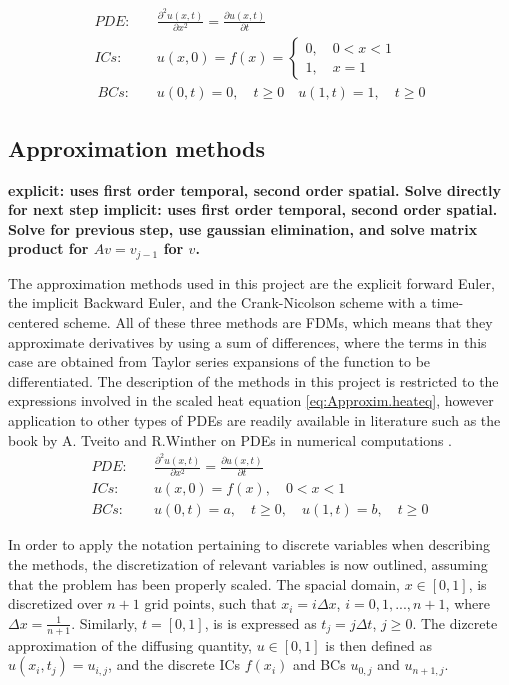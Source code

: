 \documentclass[%
oneside,                 %
final,                   %
10pt]{article}
\begin{document}
\begin{align}
PDE:&\quad \frac{\partial^2 u(x,t)}{\partial x^2}=\frac{\partial u(x,t)}{\partial t} \label{eq:scaled.rod}\\
ICs:&\quad u(x,0)=f(x)=  \begin{cases}
  0, \quad 0 < x < 1\\
 1, \quad x=1
  \end{cases} \label{eq:scaled.rodIC}\\\
BCs:& \quad u(0,t)=0, \quad t \geq 0 \quad u(1,t)=1, \quad t \geq 0 \label{eq:scaled.rodBC}
\end{align}

\subsection{Approximation methods}
\label{M.ApproxMethods}
\textbf{ 
explicit: uses first order temporal, second order spatial. Solve directly for next step
implicit: uses first order temporal, second order spatial. Solve for previous step, use gaussian elimination, and solve matrix product for $Av=v_{j-1}$ for $v$.}

The approximation methods used in this project are the explicit forward Euler, the implicit Backward Euler, and the Crank-Nicolson scheme with a time-centered scheme. All of these three methods are FDMs, which means that they approximate derivatives  by using a sum of differences, where the terms in this case are obtained from Taylor series expansions of the function to be differentiated. The description of the methods in this project is restricted to the expressions involved in the scaled heat equation \eqref{eq:Approxim.heateq}, however application to other types of PDEs are readily available in literature such as the book by A. Tveito and R.Winther on PDEs in numerical computations \cite{compPDE}.
\begin{align}
PDE:& \quad \frac{\partial^2 u(x,t)}{\partial x^2}=\frac{\partial u(x,t)}{\partial t} \label{eq:Approxim.heateq}\\
ICs:& \quad u(x,0)=f(x), \quad 0< x < 1 \label{eq:Approxim.IC}\\
BCs:& \quad u(0,t)=a, \quad t \geq 0, \quad u(1,t)=b, \quad t \geq 0  \label{eq:Approxim.BC}
\end{align}

In order to apply the notation pertaining to discrete variables when describing the methods, the discretization of relevant variables is now outlined, assuming that the problem has been properly scaled. The spacial domain, $x \in [0,1]$, is discretized over $n+1$ grid points, such that $x_i=i \Delta x$, $i=0,1,...,n+1$, where $\Delta x= \frac{1}{n+1}$. Similarly, $t=[0,1]$, is is expressed as $t_j=j \Delta t$, $j\geq 0$. The dizcrete approximation of the diffusing quantity, $u \in [0,1]$ is then defined as $u(x_i,t_j)=u_{i,j}$, and the discrete ICs $f(x_i)$ and BCs $u_{0,j}$ and $u_{n+1,j}$. \newline
\end{document}
